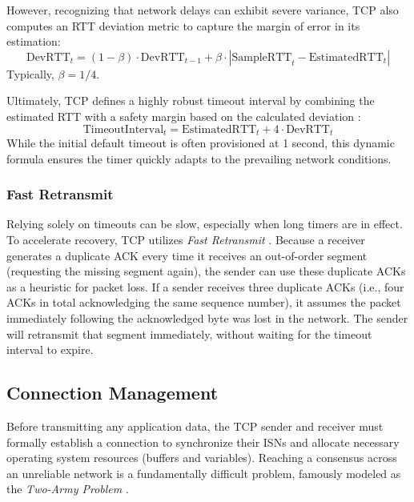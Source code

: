 However, recognizing that network delays can exhibit severe variance, TCP also computes an RTT deviation metric to capture the margin of error in its estimation:
\[
\text{DevRTT}_{t} = (1 - \beta) \cdot \text{DevRTT}_{t-1} + \beta \cdot |\text{SampleRTT}_{t} - \text{EstimatedRTT}_{t}|
\]
Typically, \( \beta = 1/4 \).

Ultimately, TCP defines a highly robust timeout interval by combining the estimated RTT with a safety margin based on the calculated deviation \cite{rfc6298}:
\[
\text{TimeoutInterval}_{t} = \text{EstimatedRTT}_{t} + 4 \cdot \text{DevRTT}_{t}
\]
While the initial default timeout is often provisioned at 1 second, this dynamic formula ensures the timer quickly adapts to the prevailing network conditions.

\subsubsection{Fast Retransmit}
Relying solely on timeouts can be slow, especially when long timers are in effect. To accelerate recovery, TCP utilizes \emph{Fast Retransmit} \cite{rfc5681}. 
Because a receiver generates a duplicate ACK every time it receives an out-of-order segment (requesting the missing segment again), the sender can use these duplicate ACKs as a heuristic for packet loss. 
If a sender receives three duplicate ACKs (i.e., four ACKs in total acknowledging the same sequence number), it assumes the packet immediately following the acknowledged byte was lost in the network. The sender will retransmit that segment immediately, without waiting for the timeout interval to expire.

\subsection{Connection Management}
Before transmitting any application data, the TCP sender and receiver must formally establish a connection to synchronize their ISNs and allocate necessary operating system resources (buffers and variables).
Reaching a consensus across an unreliable network is a fundamentally difficult problem, famously modeled as the \emph{Two-Army Problem} \cite{tanenbaum2011}.

